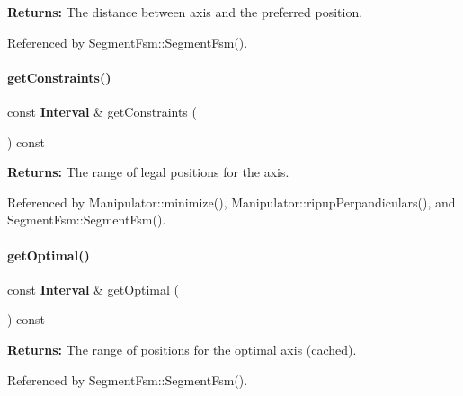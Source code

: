 {\bfseries Returns\+:} The distance between {\ttfamily axis} and the preferred position. 

Referenced by Segment\+Fsm\+::\+Segment\+Fsm().

\mbox{\label{classKite_1_1RoutingEvent_a1bea8aed79a2ac4c726e49b93af3cd37}} 
\paragraph{\texorpdfstring{get\+Constraints()}{getConstraints()}}
{\footnotesize\ttfamily const \textbf{ Interval} \& get\+Constraints (\begin{DoxyParamCaption}{ }\end{DoxyParamCaption}) const\hspace{0.3cm}{\ttfamily [inline]}}

{\bfseries Returns\+:} The range of legal positions for the axis. 

Referenced by Manipulator\+::minimize(), Manipulator\+::ripup\+Perpandiculars(), and Segment\+Fsm\+::\+Segment\+Fsm().

\mbox{\label{classKite_1_1RoutingEvent_a7dc0bafe113b8ec0c143ae4644ac79d4}} 
\paragraph{\texorpdfstring{get\+Optimal()}{getOptimal()}}
{\footnotesize\ttfamily const \textbf{ Interval} \& get\+Optimal (\begin{DoxyParamCaption}{ }\end{DoxyParamCaption}) const\hspace{0.3cm}{\ttfamily [inline]}}

{\bfseries Returns\+:} The range of positions for the optimal axis (cached). 

Referenced by Segment\+Fsm\+::\+Segment\+Fsm().

\mbox{\label{classKite_1_1RoutingEvent_a391dd4b2a826c1d4713ef24ba25f687a}} 
